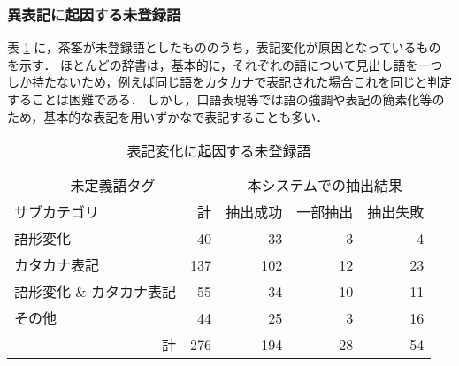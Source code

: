 \subsubsection{異表記に起因する未登録語}
\label{sec:unkrep}
表 \ref{tab:unkrep} に，茶筌が未登録語としたもののうち，表記変化が原因となっているものを示す．
ほとんどの辞書は，基本的に，それぞれの語について見出し語を一つしか持たないため，例えば同じ語をカタカナで表記された場合これを同じと判定することは困難である．
しかし，口語表現等では語の強調や表記の簡素化等のため，基本的な表記を用いずかなで表記することも多い．
\begin{table}[hbt]
\begin{minipage}{\textwidth}
\begin{center}
\caption{表記変化に起因する未登録語}
\label{tab:unkrep}
\begin{tabular}{lrrrr}
\hline
\hline
\multicolumn{2}{c}{未定義語タグ}& \multicolumn{3}{c}{本システムでの抽出結果} \\
サブカテゴリ             & 計  & 抽出成功 & 一部抽出 & 抽出失敗   \\
\hline
語形変化                 &  40 &  33 &  3 &  4 \\
カタカナ表記             & 137 & 102 & 12 & 23 \\ 
語形変化 \& カタカナ表記 &  55 &  34 & 10 & 11 \\
その他                   &  44 &  25 &  3 & 16 \\
\hline
\multicolumn{1}{r}{計}   & 276 & 194 & 28 & 54 \\
\hline
\hline
\end{tabular}
\end{center}
\end{minipage}
\end{table}
